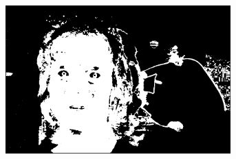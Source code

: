 \begin{figure}[H]
\begin{subfigure}{.24\textwidth}
  \caption{}
\end{subfigure}
\begin{subfigure}{.24\textwidth}
  \centering
  \includegraphics[width=0.95\textwidth]{img/fd/ForegroundMaskAndEstimatedSkinMaskAndNonFaceMask.png}
  \caption{}
\end{subfigure}



\end{figure}
